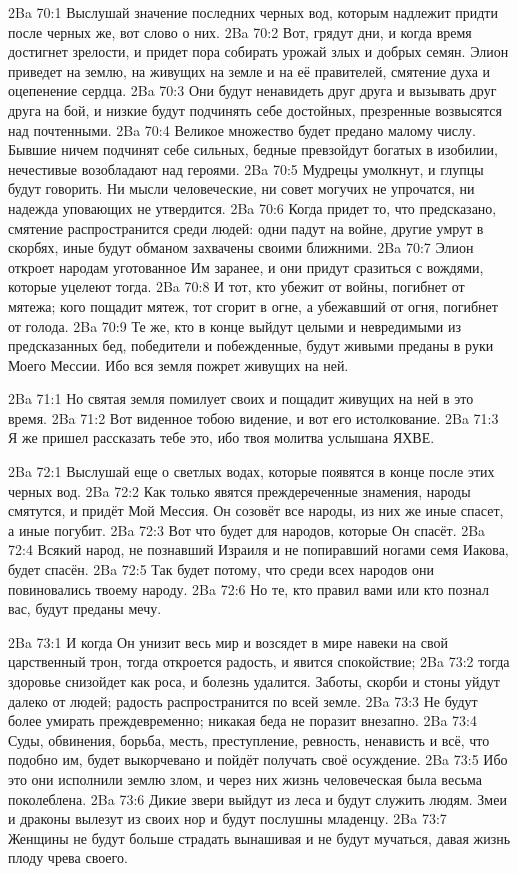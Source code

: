 \vs 2Ba 70:1
Выслушай значение последних черных вод, которым надлежит придти после черных же, вот слово о них.
\vs 2Ba 70:2
Вот, грядут дни, и когда время достигнет зрелости, и придет пора собирать урожай злых и добрых семян. Элион приведет на землю, на живущих на земле и на её правителей, смятение духа и оцепенение сердца.
\vs 2Ba 70:3
Они будут ненавидеть друг друга и вызывать друг друга на бой, и низкие будут подчинять себе достойных, презренные возвысятся над почтенными.
\vs 2Ba 70:4
Великое множество будет предано малому числу. Бывшие ничем подчинят себе сильных, бедные превзойдут богатых в изобилии, нечестивые возобладают над героями.
\vs 2Ba 70:5
Мудрецы умолкнут, и глупцы будут говорить. Ни мысли человеческие, ни совет могучих не упрочатся, ни надежда уповающих не утвердится.
\vs 2Ba 70:6
Когда придет то, что предсказано, смятение распространится среди людей: одни падут на войне, другие умрут в скорбях, иные будут обманом захвачены своими ближними.
\vs 2Ba 70:7
Элион откроет народам уготованное Им заранее, и они придут сразиться с вождями, которые уцелеют тогда.
\vs 2Ba 70:8
И тот, кто убежит от войны, погибнет от мятежа; кого пощадит мятеж, тот сгорит в огне, а убежавший от огня, погибнет от голода.
\vs 2Ba 70:9
Те же, кто в конце выйдут целыми и невредимыми из предсказанных бед, победители и побежденные, будут живыми преданы в руки Моего Мессии. Ибо вся земля пожрет живущих на ней.

\vs 2Ba 71:1
Но святая земля помилует своих и пощадит живущих на ней в это время.
\vs 2Ba 71:2
Вот виденное тобою видение, и вот его истолкование.
\vs 2Ba 71:3
Я же пришел рассказать тебе это, ибо твоя молитва услышана ЯХВЕ.

\vs 2Ba 72:1
Выслушай еще о светлых водах, которые появятся в конце после этих черных вод.
\vs 2Ba 72:2
Как только явятся преждереченные знамения, народы смятутся, и придёт Мой Мессия. Он созовёт все народы, из них же иные спасет, а иные погубит.
\vs 2Ba 72:3
Вот что будет для народов, которые Он спасёт.
\vs 2Ba 72:4
Всякий народ, не познавший Израиля и не попиравший ногами семя Иакова, будет спасён.
\vs 2Ba 72:5
Так будет потому, что среди всех народов они повиновались твоему народу.
\vs 2Ba 72:6
Но те, кто правил вами или кто познал вас, будут преданы мечу.

\vs 2Ba 73:1
И когда Он унизит весь мир и возсядет в мире навеки на свой царственный трон, тогда откроется радость, и явится спокойствие;
\vs 2Ba 73:2
тогда здоровье снизойдет как роса, и болезнь удалится. Заботы, скорби и стоны уйдут далеко от людей; радость распространится по всей земле.
\vs 2Ba 73:3
Не будут более умирать преждевременно; никакая беда не поразит внезапно.
\vs 2Ba 73:4
Суды, обвинения, борьба, месть, преступление, ревность, ненависть и всё, что подобно им, будет выкорчевано и пойдёт получать своё осуждение.
\vs 2Ba 73:5
Ибо это они исполнили землю злом, и через них жизнь человеческая была весьма поколеблена.
\vs 2Ba 73:6
Дикие звери выйдут из леса и будут служить людям. Змеи и драконы вылезут из своих нор и будут послушны младенцу.
\vs 2Ba 73:7
Женщины не будут больше страдать вынашивая и не будут мучаться, давая жизнь плоду чрева своего.

